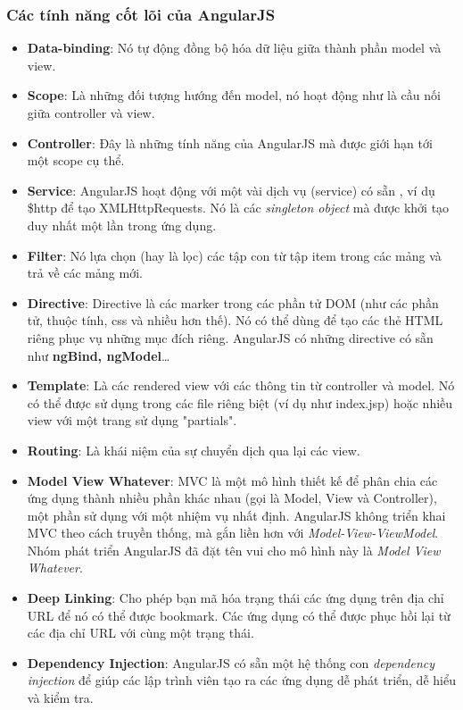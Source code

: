 \documentclass[a4paper]{article}
\begin{document}
\subsubsection{Các tính năng cốt lõi của AngularJS}
\begin{itemize}
	\item \textbf{Data-binding}: Nó tự động đồng bộ hóa dữ liệu giữa thành phần model và view.

	\item \textbf{Scope}: Là những đối tượng hướng đến model, nó hoạt động như là cầu nối giữa controller và view.

	\item \textbf{Controller}: Đây là những tính năng của AngularJS mà được giới hạn tới một scope cụ thể.

	\item \textbf{Service}: AngularJS hoạt động với một vài dịch vụ (service) có sẵn , ví dụ \$http để tạo XMLHttpRequests. Nó là các \textit{singleton object} mà được khởi tạo duy nhất một lần trong ứng dụng.

	\item \textbf{Filter}: Nó lựa chọn (hay là lọc) các tập con từ tập item trong các mảng và trả về các mảng mới.

	\item \textbf{Directive}: Directive là các marker trong các phần tử DOM (như các phần tử, thuộc tính, css và nhiều hơn thế). Nó có thể dùng để tạo các thẻ HTML riêng phục vụ những mục đích riêng. AngularJS có những directive có sẵn như \textbf{ngBind, ngModel}…

	\item \textbf{Template}: Là các rendered view với các thông tin từ controller và model. Nó có thể được sử dụng trong các file riêng biệt (ví dụ như index.jsp) hoặc nhiều view với một trang sử dụng "partials".

	\item \textbf{Routing}: Là khái niệm của sự chuyển dịch qua lại các view.

	\item \textbf{Model View Whatever}: MVC là một mô hình thiết kế để phân chia các ứng dụng thành nhiều phần khác nhau (gọi là Model, View và Controller), một phần sử dụng với một nhiệm vụ nhất định. AngularJS không triển khai MVC theo cách truyền thống, mà gắn liền hơn với \textit{Model-View-ViewModel}. Nhóm phát triển AngularJS đã đặt tên vui cho mô hình này là \textit{Model View Whatever}.

	\item \textbf{Deep Linking}: Cho phép bạn mã hóa trạng thái các ứng dụng trên địa chỉ URL để nó có thể được bookmark. Các ứng dụng có thể được phục hồi lại từ các địa chỉ URL với cùng một trạng thái.

	\item \textbf{Dependency Injection}: AngularJS có sẵn một hệ thống con \textit{dependency injection} để giúp các lập trình viên tạo ra các ứng dụng dễ phát triển, dễ hiểu và kiểm tra.
\end{itemize}
\end{document}
